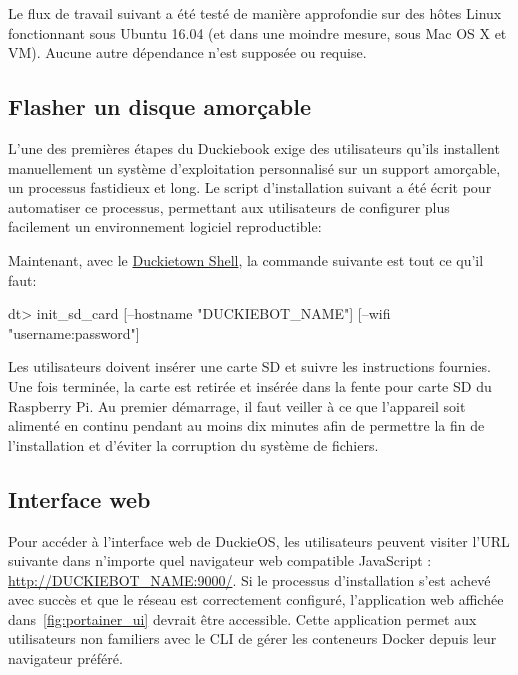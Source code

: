 \noindentent Le flux de travail suivant a été testé de manière approfondie sur des hôtes Linux fonctionnant sous Ubuntu 16.04 (et dans une moindre mesure, sous Mac OS X et VM). Aucune autre dépendance n'est supposée ou requise.

\subsection{Flasher un disque amorçable}

L'une des premières étapes du Duckiebook exige des utilisateurs qu'ils installent manuellement un système d'exploitation personnalisé sur un support amorçable, un processus fastidieux et long. Le script d'installation suivant a été écrit pour automatiser ce processus, permettant aux utilisateurs de configurer plus facilement un environnement logiciel reproductible:

%
Maintenant, avec le \href{https://github.com/duckietown/duckietown-shell}{Duckietown Shell}, la commande suivante est tout ce qu'il faut:
%
\begin{dtslisting}
dt> init_sd_card [--hostname "DUCKIEBOT_NAME"] [--wifi "username:password"]
\end{dtslisting}
%
Les utilisateurs doivent insérer une carte SD et suivre les instructions fournies. Une fois terminée, la carte est retirée et insérée dans la fente pour carte SD du Raspberry Pi. Au premier démarrage, il faut veiller à ce que l'appareil soit alimenté en continu pendant au moins dix minutes afin de permettre la fin de l'installation et d'éviter la corruption du système de fichiers.

\subsection{Interface web}

Pour accéder à l'interface web de DuckieOS, les utilisateurs peuvent visiter l'URL suivante dans n'importe quel navigateur web compatible JavaScript : \url{http://DUCKIEBOT_NAME:9000/}. Si le processus d'installation s'est achevé avec succès et que le réseau est correctement configuré, l'application web affichée dans~\autoref{fig:portainer_ui} devrait être accessible. Cette application permet aux utilisateurs non familiers avec le CLI de gérer les conteneurs Docker depuis leur navigateur préféré.

